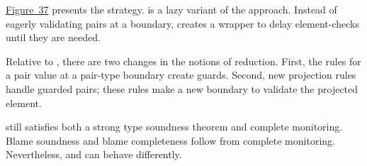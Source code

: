 \documentclass[ twoside,open=right,titlepage,numbers=noenddot,headinclude,%
                footinclude=true,cleardoublepage=empty,abstract=off,
                BCOR=5mm,paper=a4,fontsize=11pt,%
                ngerman,american,%
                parts,pdfspacing]{scrreprt}
\newcommand{\FigureRef}[2]{#1}
\begin{document}
\hyperref[t:x28counter_x28x22figurex22_x22figx3aconaturalx2dreductionx22x29x29]{Figure~\FigureRef{37}{t:x28counter_x28x22figurex22_x22figx3aconaturalx2dreductionx22x29x29}} presents the \relax{\cname} strategy.
\relax{\cname} is a lazy variant of the \relax{\nname} approach.
Instead of eagerly validating pairs at a boundary, \relax{\cname} creates a wrapper
 to delay element{-}checks until they are needed.

Relative to \relax{\nname}, there are two changes in the notions of reduction.
First, the rules for a pair value at a pair{-}type boundary create guards.
Second, new projection rules handle guarded pairs;
 these rules make a new boundary to validate the projected element.

\relax{\cname} still satisfies both a strong type soundness theorem and complete
 monitoring.
Blame soundness and blame completeness follow from complete monitoring.
Nevertheless, \relax{\cname} and \relax{\nname} can behave differently.

\end{document}
